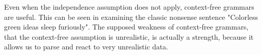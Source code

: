 Even when the independence assumption does not apply, context-free grammars
are useful. This can be seen in examining the classic nonsense
sentence "Colorless green ideas sleep furiously". The supposed
weakness of context-free grammars, that the context-free assumption is
unrealistic, is actually a strength, because it allows us to parse and
react to very unrealistic data.










